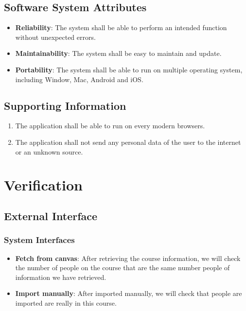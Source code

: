 \documentclass[ 10pt]{report}
\begin{document}
        \subsection{Software System Attributes}
        \begin{itemize}
            \item \textbf{Reliability}: The system shall be able to perform an intended function without unexpected errors.
            \item \textbf{Maintainability}: The system shall be easy to maintain and update.
            \item \textbf{Portability}: The system shall be able to run on multiple operating system, including Window, Mac, Android and iOS.
        \end{itemize}
        \subsection{Supporting Information}
        \begin{enumerate}
            \item The application shall be able to run on every modern browsers.
            \item The application shall not send any personal data of the user to the internet or an unknown source.
        \end{enumerate}
    \pagebreak

    \section{Verification}
        \subsection{External Interface}
        \subsubsection{System Interfaces}
            \begin{itemize}
                \item \textbf{Fetch from canvas}: After retrieving the course information, we will check the number of people on the course that are the same number people of information we have retrieved.
                \item \textbf{Import manually}: After imported manually, we will check that people are imported are really in this course.
            \end{itemize}
\end{document}
